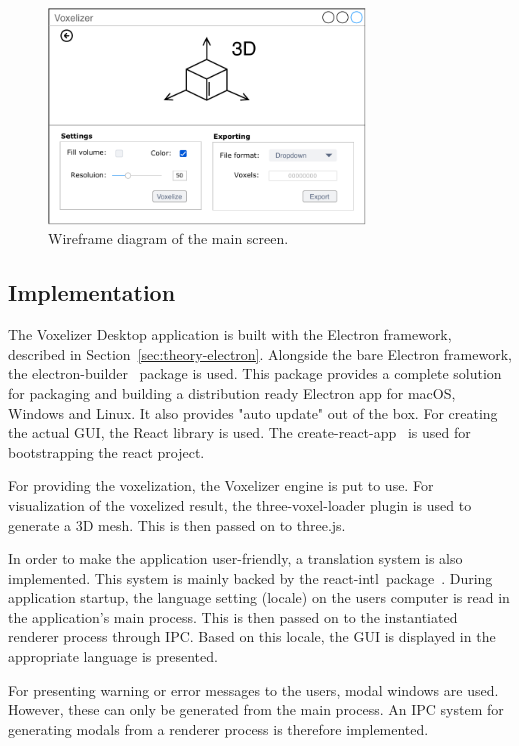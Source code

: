 \begin{figure}[htp]
    \centering
    \includegraphics[width=0.75\textwidth]{sections/methodology/figures/wireframes/wireframe-main-screen.pdf}
    \caption{Wireframe diagram of the main screen.}
    \label{fig:wireframe-main-screen}
\end{figure}

\subsection{Implementation}
The Voxelizer Desktop application is built with the Electron framework, described in Section~\ref{sec:theory-electron}. Alongside the bare Electron framework, the electron-builder~\cite{electron-builder} package is used. This package provides a complete solution for packaging and building a distribution ready Electron app for macOS, Windows and Linux. It also provides "auto update" out of the box. For creating the actual GUI, the React library is used. The create-react-app~\cite{create-react-app} is used for bootstrapping the react project.

For providing the voxelization, the Voxelizer engine is put to use. For visualization of the voxelized result, the three-voxel-loader plugin is used to generate a 3D mesh. This is then passed on to three.js.

In order to make the application user-friendly, a translation system is also implemented. This system is mainly backed by the react-intl~package~\cite{react-intl}. During application startup, the language setting (locale) on the users computer is read in the application's main process. This is then passed on to the instantiated renderer process through IPC. Based on this locale, the GUI is displayed in the appropriate language is presented.

For presenting warning or error messages to the users, modal windows are used. However, these can only be generated from the main process. An IPC system for generating modals from a renderer process is therefore implemented.

